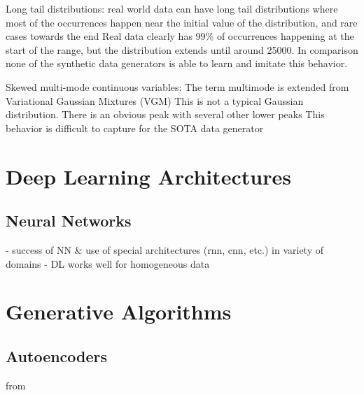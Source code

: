 Long tail distributions:\cite{zhao2022CTABGANEnhancingTabular}
    real world data can have long tail distributions where most of the occurrences happen near the initial value of the distribution, and rare cases towards the end
    Real data clearly has 99\% of occurrences happening at the start of the range, 
    but the distribution extends until around 25000. 
    In comparison none of the synthetic data generators is able to learn and imitate this behavior.

Skewed multi-mode continuous variables:\cite{zhao2022CTABGANEnhancingTabular}
    The term multimode is extended from Variational Gaussian Mixtures (VGM)
    This is not a typical Gaussian distribution. There is an obvious peak
    with several other lower peaks
    This behavior is difficult to capture for the SOTA data generator


\section{Deep Learning Architectures}
\label{ch:preliminaries-deepLearningArchitectures}

\subsection{Neural Networks}
\label{ch:preliminaries-deepLearningArchitectures-neuralNetworks}

- success of NN \& use of special architectures (rnn, cnn, etc.) in variety of domains \cite{borisov2022DeepNeuralNetworks}
- DL works well for homogeneous data \cite{borisov2022DeepNeuralNetworks}

\section{Generative Algorithms}
\label{ch:preliminaries-generativeAlgorithms}

\subsection{Autoencoders}
\label{ch:preliminaries-generativeAlgorithms-variationalAutoencoders}

from \cite{kingma2013AutoEncodingVariationalBayes}

